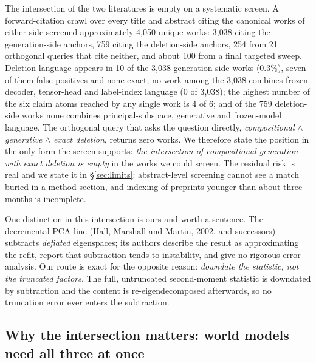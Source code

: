 \documentclass{article} %
\begin{document}
The intersection of the two literatures is empty on a systematic screen. A forward-citation
crawl over every title and abstract citing the canonical works of either side screened
approximately 4,050 unique works: 3,038 citing the generation-side anchors, 759 citing the
deletion-side anchors, 254 from 21 orthogonal queries that cite neither, and about 100 from
a final targeted sweep. %
Deletion language appears in 10 of the 3,038 generation-side works (0.3\%), seven of them
false positives and none exact; no work among the 3,038 combines frozen-decoder,
tensor-head and label-index language (0 of 3,038); the highest number of the six claim
atoms reached by any single work is 4 of 6; and of the 759 deletion-side works none combines
principal-subspace, generative and frozen-model language. %
The orthogonal query that asks the question directly, \emph{compositional} $\wedge$
\emph{generative} $\wedge$ \emph{exact deletion}, returns zero works.
We therefore state the position in the only form the screen supports: \emph{the intersection
of compositional generation with exact deletion is empty} in the works we could screen.
The residual risk is real and we state it in \S\ref{sec:limits}: abstract-level screening
cannot see a match buried in a method section, and indexing of preprints younger than about
three months is incomplete.

One distinction in this intersection is ours and worth a sentence. The decremental-PCA line
(Hall, Marshall and Martin, 2002, and successors) subtracts \emph{deflated} eigenspaces; its
authors describe the result as approximating the refit, report that subtraction tends to
instability, and give no rigorous error analysis. Our route is exact for the opposite reason:
\emph{downdate the statistic, not the truncated factors}. The full, untruncated second-moment
statistic is downdated by subtraction and the content is re-eigendecomposed afterwards, so no
truncation error ever enters the subtraction.

\subsection{Why the intersection matters: world models need all three at once}
\label{sec:why}
\end{document}
